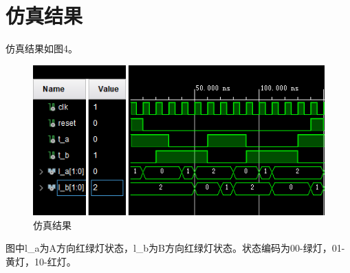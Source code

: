 \documentclass[a4paper]{article}
\begin{document}
	\section{仿真结果}
		仿真结果如图4。
		\begin{figure}[htbp]
			\centering
			\includegraphics[scale=1.1]{仿真结果.png}
			\caption{仿真结果}
		\end{figure}\par
		图中l\_a为A方向红绿灯状态，l\_b为B方向红绿灯状态。状态编码为00-绿灯，01-黄灯，10-红灯。
\end{document}
